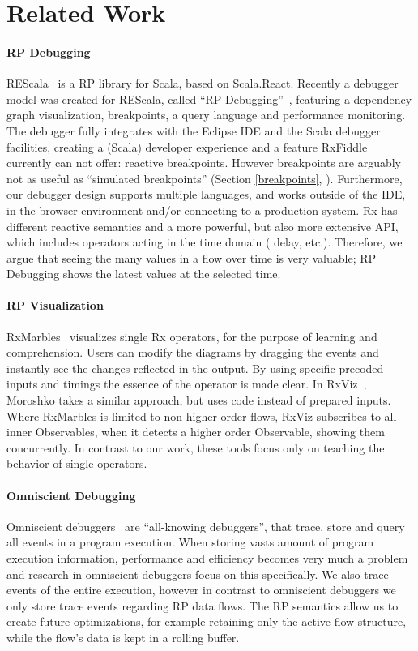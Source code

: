 \section{Related Work}

\paragraph{RP Debugging} REScala~\cite{salvaneschi2014rescala} is a RP
library for Scala, based on Scala.React.  Recently a debugger model was
created for REScala, called ``RP Debugging''~\cite{salvaneschi2016debugging},
featuring a dependency graph visualization, breakpoints, a query
language and performance monitoring.  The debugger fully integrates with
the Eclipse IDE and the Scala debugger facilities, creating a (Scala)
developer experience and a feature RxFiddle currently can not offer:
reactive breakpoints.  However breakpoints are arguably not as useful as
``simulated breakpoints'' (Section%
\ref{breakpoints}, ).  Furthermore, our debugger
design supports multiple languages, and works outside of the IDE, in the
browser environment and/or connecting to a production system.  Rx has
different reactive semantics and a more powerful, but also more
extensive API, which includes operators acting in the time domain (\code
{delay}, etc.).  Therefore, we argue that seeing the many values in a
flow over time is very valuable; RP Debugging shows the latest values at
the selected time.

\paragraph{RP Visualization} RxMarbles~\cite{rxmarbles} visualizes
single Rx operators, for the purpose of learning and comprehension.
Users can modify the diagrams by dragging the events and instantly see
the changes reflected in the output.  By using specific precoded inputs
and timings the essence of the operator is made clear.  In RxViz~\cite{rxviz}, 
Moroshko takes a similar approach, but uses code instead of prepared inputs.
Where RxMarbles is limited to non higher order flows, RxViz subscribes to
all inner Observables, when it detects a higher order Observable, showing
them concurrently.  In contrast to our work, these tools focus only on
teaching the behavior of single operators.

\paragraph{Omniscient Debugging} Omniscient debuggers~\cite{pothier2009back}
are ``all-knowing debuggers'', that trace, store and query all events in
a program execution.  When storing vasts amount of program execution
information, performance and efficiency becomes very much a problem and
research in omniscient debuggers focus on this specifically.  We also
trace events of the entire execution, however in contrast to omniscient
debuggers we only store trace events regarding RP data flows.  The RP
semantics allow us to create future optimizations, for example retaining
only the active flow structure, while the flow's data is kept in a
rolling buffer.

